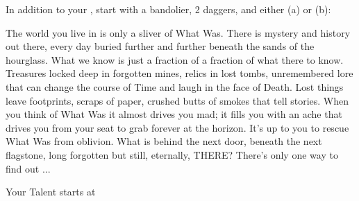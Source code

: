 {{  }

  In addition to your , start with a bandolier, 2 daggers, and either (a) or (b):







  The world you live in is only a sliver of What Was.  There is mystery and history out there, every day buried further and further beneath the sands of the hourglass.  What we know is just a fraction of a fraction of what there  to know.  Treasures locked deep in forgotten mines, relics in lost tombs, unremembered lore that can change the course of Time and laugh in the face of Death.  Lost things leave footprints, scraps of paper, crushed butts of smokes that tell stories.  When you think of What Was it almost drives you mad; it fills you with an ache that drives you from your seat to grab forever at the horizon.  It's up to you to rescue What Was from oblivion. What is behind the next door, beneath the next flagstone, long forgotten but still, eternally, THERE?    There's only one way to find out ...





  Your Talent starts at \DCUP

}
